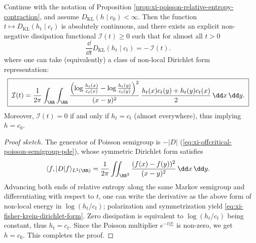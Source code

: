 \begin{proposition}\label{prop:xi-poisson-relative-entropy-fisher-krein}
Continue with the notation of Proposition \ref{prop:xi-poisson-relative-entropy-contraction}, and assume \(D_{\mathrm{KL}}(h\mid c_0)<\infty\).
Then the function
\(
t\mapsto D_{\mathrm{KL}}(h_t\mid c_t)
\)
is absolutely continuous, and there exists an explicit non-negative dissipation functional \(\mathcal{I}(t)\ge 0\) such that for almost all \(t>0\)
\begin{equation}\label{eq:xi-fisher-krein-dissipation}
\boxed{\;
\frac{\dd}{\dd t}D_{\mathrm{KL}}(h_t\mid c_t)=-\,\mathcal{I}(t).\;}
\end{equation}
where one can take (equivalently) a class of non-local Dirichlet form representation:
\begin{equation}\label{eq:xi-fisher-krein-dirichlet-form}
\boxed{\;
\mathcal I(t)=\frac{1}{2\pi}\int_{\RR}\int_{\RR}
\frac{\Bigl(\log\frac{h_t(x)}{c_t(x)}-\log\frac{h_t(y)}{c_t(y)}\Bigr)^2}{(x-y)^2}\,
\frac{h_t(x)c_t(y)+h_t(y)c_t(x)}{2}\,\dd x\,\dd y.\;}
\end{equation}
Moreover, \(\mathcal{I}(t)=0\) if and only if \(h_t=c_t\) (almost everywhere), thus implying \(h=c_0\).
\end{proposition}

\begin{proof}[Proof sketch]
The generator of Poisson semigroup is \(-|D|\) (\eqref{eq:xi-offcritical-poisson-semigroup-pde}), whose symmetric Dirichlet form satisfies
\[
\langle f,|D|f\rangle_{L^2(\RR)}
=\frac{1}{2\pi}\iint_{\RR^2}\frac{(f(x)-f(y))^2}{(x-y)^2}\,\dd x\,\dd y.
\]
Advancing both ends of relative entropy along the same Markov semigroup and differentiating with respect to \(t\), one can write the derivative as the above form of non-local energy in \(\log(h_t/c_t)\); polarization and symmetrization yield \eqref{eq:xi-fisher-krein-dirichlet-form}.
Zero dissipation is equivalent to \(\log(h_t/c_t)\) being constant, thus \(h_t=c_t\).
Since the Poisson multiplier \(e^{-t|\xi|}\) is non-zero, we get \(h=c_0\). This completes the proof.
\end{proof}

